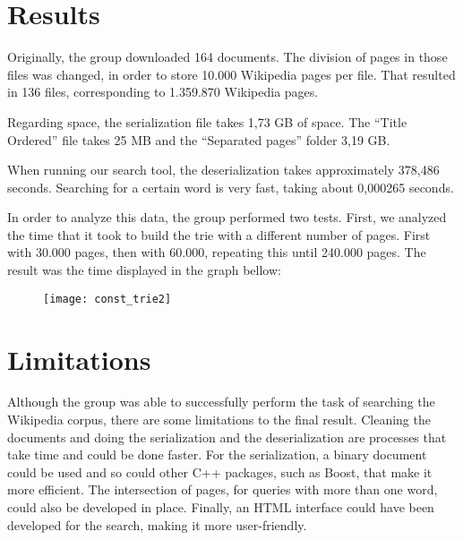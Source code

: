 \documentclass{article}
\begin{document}

\section*{Results}
Originally, the group downloaded 164 documents. The division of pages in those files was changed, in order to store 10.000 Wikipedia pages per file. That resulted in 136 files, corresponding to 1.359.870 Wikipedia pages. 

Regarding space, the serialization file takes 1,73 GB of space. The ``Title Ordered'' file takes 25 MB and the ``Separated pages'' folder 3,19 GB. 

When running our search tool, the deserialization takes approximately 378,486 seconds. Searching for a certain word is very fast, taking about 0,000265 seconds. 

In order to analyze this data, the group performed two tests. First, we analyzed the time that it took to build the trie with a different number of pages. First with 30.000 pages, then with 60.000, repeating this until 240.000 pages. The result was the time displayed in the graph bellow:

\begin{figure}[h!]
 \centering
  \texttt{[image: const\_trie2]}
 \end{figure}

\section*{Limitations}
Although the group was able to successfully perform the task of searching the Wikipedia corpus, there are some limitations to the final result. Cleaning the documents and doing the serialization and the deserialization are processes that take time and could be done faster. For the serialization, a binary document could be used and so could other C++ packages, such as Boost, that make it more efficient. The intersection of pages, for queries with more than one word, could also be developed in place. Finally, an HTML interface could have been developed for the search, making it more user-friendly.
\end{document}
